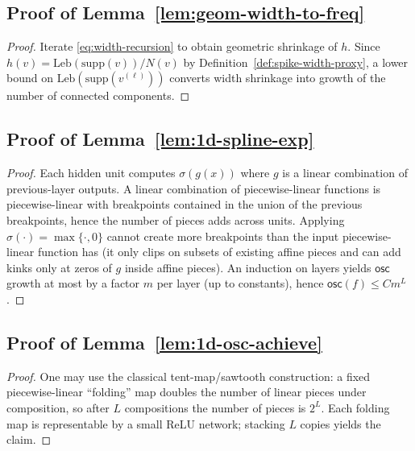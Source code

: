 \subsection*{Proof of Lemma~\ref{lem:geom-width-to-freq}}
\begin{proof}
Iterate \eqref{eq:width-recursion} to obtain geometric shrinkage of $h$.
Since $h(v)=\mathrm{Leb}(\mathrm{supp}(v))/N(v)$ by Definition~\ref{def:spike-width-proxy}, a lower bound on $\mathrm{Leb}(\mathrm{supp}(v^{(\ell)}))$ converts width shrinkage into growth of the number of connected components.
\end{proof}

\subsection*{Proof of Lemma~\ref{lem:1d-spline-exp}}
\begin{proof}
Each hidden unit computes $\sigma(g(x))$ where $g$ is a linear combination of previous-layer outputs.
A linear combination of piecewise-linear functions is piecewise-linear with breakpoints contained in the union of the previous breakpoints, hence the number of pieces adds across units.
Applying $\sigma(\cdot)=\max\{\cdot,0\}$ cannot create more breakpoints than the input piecewise-linear function has (it only clips on subsets of existing affine pieces and can add kinks only at zeros of $g$ inside affine pieces).
An induction on layers yields $\mathsf{osc}$ growth at most by a factor $m$ per layer (up to constants), hence $\mathsf{osc}(f)\le C m^L$.
\end{proof}

\subsection*{Proof of Lemma~\ref{lem:1d-osc-achieve}}
\begin{proof}
One may use the classical tent-map/sawtooth construction: a fixed piecewise-linear ``folding'' map doubles the number of linear pieces under composition, so after $L$ compositions the number of pieces is $2^L$.
Each folding map is representable by a small ReLU network; stacking $L$ copies yields the claim.
\end{proof}


